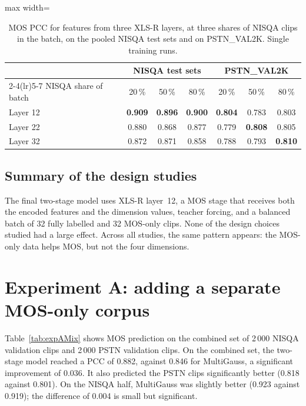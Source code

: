 \documentclass[
english,                 %
bibtex,                  %
includeExtraAbstracts, %
]{kththesis}
\numberwithin{listing}{chapter}
\begin{document}
\begin{table}[!ht]
  \centering
  \caption{MOS PCC for features from three XLS-R layers, at three shares of NISQA clips in the batch, on the pooled NISQA test sets and on PSTN\_VAL2K. Single training runs.}
  \label{tab:sslLayer}
  \setlength{\tabcolsep}{4pt}
  \begin{adjustbox}{max width=\textwidth}
  \begin{tabular}{lcccccc}
    \toprule
     & \multicolumn{3}{c}{NISQA test sets} & \multicolumn{3}{c}{PSTN\_VAL2K} \\
    \cmidrule(lr){2-4}\cmidrule(lr){5-7}
    NISQA share of batch & 20\,\% & 50\,\% & 80\,\% & 20\,\% & 50\,\% & 80\,\% \\
    \midrule
    Layer 12 & \textbf{0.909} & \textbf{0.896} & \textbf{0.900} & \textbf{0.804} & 0.783 & 0.803 \\
    Layer 22 & 0.880 & 0.868 & 0.877 & 0.779 & \textbf{0.808} & 0.805 \\
    Layer 32 & 0.872 & 0.871 & 0.858 & 0.788 & 0.793 & \textbf{0.810} \\
    \bottomrule
  \end{tabular}
  \end{adjustbox}
\end{table}

\subsection{Summary of the design studies}

The final two-stage model uses XLS-R layer~12, a MOS stage that receives both the encoded features and the dimension values, teacher forcing, and a balanced batch of 32 fully labelled and 32 MOS-only clips. None of the design choices studied had a large effect. Across all studies, the same pattern appears: the MOS-only data helps MOS, but not the four dimensions.

\section{Experiment A: adding a separate MOS-only corpus}
\label{sec:resultsExpA}

Table~\ref{tab:expAMix} shows MOS prediction on the combined set of 2\,000 NISQA validation clips and 2\,000 PSTN validation clips. On the combined set, the two-stage model reached a PCC of 0.882, against 0.846 for MultiGauss, a significant improvement of 0.036. It also predicted the PSTN clips significantly better (0.818 against 0.801). On the NISQA half, MultiGauss was slightly better (0.923 against 0.919); the difference of 0.004 is small but significant.
\end{document}
